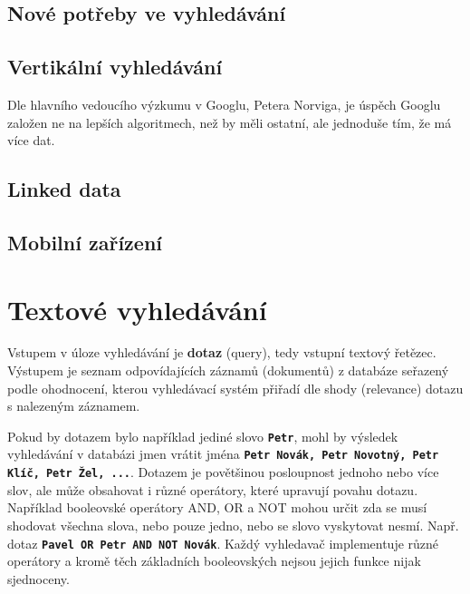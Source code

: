 \documentclass[12pt,letterpaper,oneside,openright]{book}
\newcommand{\bftt}[1]{\texttt{\textbf{#1}}}
\begin{document}

\subsection{Nové potřeby ve vyhledávání}
\subsection{Vertikální vyhledávání}
Dle hlavního vedoucího výzkumu v Googlu, Petera Norviga, je úspěch Googlu
založen ne na lepších algoritmech, než by měli ostatní, ale jednoduše tím, že
má více dat.
\subsection{Linked data}
\subsection{Mobilní zařízení}



\section{Textové vyhledávání}
Vstupem v úloze vyhledávání je \textbf{dotaz} (query), tedy vstupní textový
řetězec. Výstupem je seznam odpovídajících záznamů (dokumentů) z databáze
seřazený podle ohodnocení, kterou vyhledávací systém přiřadí dle shody
(relevance) dotazu s nalezeným záznamem.

Pokud by dotazem bylo například jediné slovo \bftt{Petr}, mohl by výsledek
vyhledávání v databázi jmen vrátit jména \bftt{Petr Novák, Petr Novotný, Petr
Klíč, Petr Žel, ...}. Dotazem je povětšinou posloupnost jednoho nebo více slov,
ale může obsahovat i různé operátory, které upravují povahu dotazu. Například
booleovské operátory AND, OR a NOT mohou určit zda se musí shodovat všechna
slova, nebo pouze jedno, nebo se slovo vyskytovat nesmí. Např. dotaz
\bftt{Pavel OR Petr AND NOT Novák}. Každý vyhledavač implementuje různé
operátory a kromě těch základních booleovských nejsou jejich funkce nijak
sjednoceny.
\end{document}
